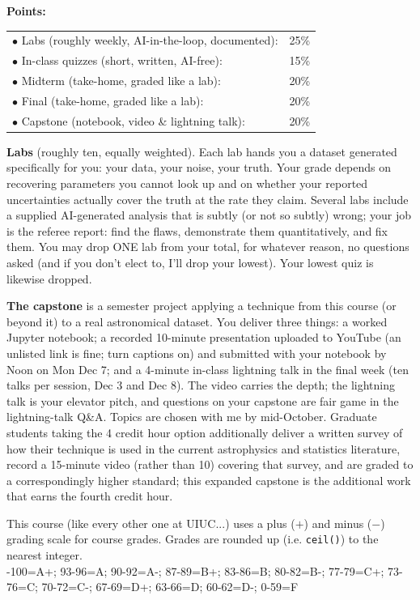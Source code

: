 {\bf \headerfont \color{RoyalBlue} Points:}
\begin{tabular}{ll}
$\bullet$ Labs (roughly weekly, AI-in-the-loop, documented): & 25\% \\
$\bullet$ In-class quizzes (short, written, AI-free): & 15\% \\
$\bullet$ Midterm (take-home, graded like a lab): & 20\% \\
$\bullet$ Final (take-home, graded like a lab): & 20\% \\
$\bullet$ Capstone (notebook, video \& lightning talk): & 20\% \\
\end{tabular}

{\bf Labs} (roughly ten, equally weighted). Each lab hands you a dataset generated specifically for you: your data, your
noise, your truth. Your grade depends on recovering parameters you cannot
look up and on whether your reported uncertainties actually cover the truth at
the rate they claim. Several labs include a supplied AI-generated analysis
that is subtly (or not so subtly) wrong; your job is the referee report:
find the flaws, demonstrate them quantitatively, and fix them. You may drop
ONE lab from your total, for whatever reason, no questions asked (and if you
don't elect to, I'll drop your lowest). Your lowest quiz is likewise dropped.

{\bf The capstone} is a semester project applying a technique from this course
(or beyond it) to a real astronomical dataset. You deliver three things: a
worked Jupyter notebook; a recorded 10-minute presentation uploaded to YouTube
(an unlisted link is fine; turn captions on) and submitted with your notebook
by Noon on Mon Dec 7; and a 4-minute in-class lightning talk in the final week
(ten talks per session, Dec 3 and Dec 8). The video carries the depth; the
lightning talk is your elevator pitch, and questions on your capstone are fair
game in the lightning-talk Q\&A. Topics are chosen with me by mid-October. Graduate students taking the 4 credit hour
option additionally deliver a written survey of how their technique is used in
the current astrophysics and statistics literature, record a 15-minute video
(rather than 10) covering that survey, and are graded to a correspondingly
higher standard; this expanded capstone is the additional work that earns the
fourth credit hour.

This course (like every other one at UIUC...) uses a plus ($+$) and minus
($-$) grading scale for course grades.
Grades are rounded up (i.e. \texttt{ceil()}) to the nearest integer.\\
-100=A+; 93-96=A; 90-92=A-; 87-89=B+; 83-86=B; 80-82=B-; 77-79=C+; 73-76=C; 70-72=C-;
67-69=D+; 63-66=D; 60-62=D-; 0-59=F
\medskip


